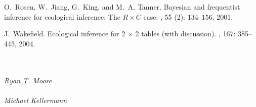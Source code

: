 \begin{thebibliography}{9}
O.~Rosen, W.~Jiang, G.~King, and M.~A. Tanner.
\newblock Bayesian and frequentist inference for ecological inference: The ${R}
  \times {C}$ case.
, 55 (2): 134--156,
  2001.

J.~Wakefield.
\newblock Ecological inference for 2 $\times$ 2 tables (with discussion).
, 167:
  385--445, 2004.

\end{thebibliography}





\begin{flushleft}
\address{Olivia Lau}\\
\\
\emph{Ryan T. Moore}\\
\\
\emph{Michael Kellermann}\\
\\
\address{Institute for Quantitative Social Science\\
Harvard University, Cambridge, MA}
\end{flushleft}

